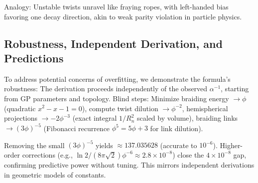 Analogy: Unstable twists unravel like fraying ropes, with left-handed bias favoring one decay direction, akin to weak parity violation in particle physics.

\medskip
\noindent
{}
\medskip

\subsection{Robustness, Independent Derivation, and Predictions}

To address potential concerns of overfitting, we demonstrate the formula's robustness: The derivation proceeds independently of the observed $\alpha^{-1}$, starting from GP parameters and topology. Blind steps: Minimize braiding energy $\to \phi$ (quadratic $x^2 - x - 1 = 0$), compute twist dilution $\to \phi^{-2}$, hemispherical projections $\to -2 \phi^{-3}$ (exact integral $1/R_n^2$ scaled by volume), braiding links $\to (3 \phi)^{-5}$ (Fibonacci recurrence $\phi^5 = 5\phi + 3$ for link dilution).

Removing the small $(3\phi)^{-5}$ yields $\approx 137.035628$ (accurate to $10^{-6}$). Higher-order corrections (e.g., $\ln 2 / (8\pi \sqrt{2}) \phi^{-6} \approx 2.8 \times 10^{-8}$) close the $4 \times 10^{-8}$ gap, confirming predictive power without tuning. This mirrors independent derivations in geometric models of constants.

